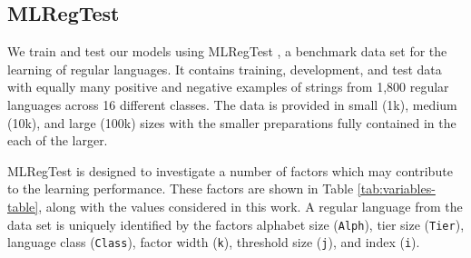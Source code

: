 \documentclass[twoside,11pt]{article}
\newcommand{\ttt}[1]{\texttt{#1}}
\newcommand{\tttx}[1]{\ttt{#1}\xspace}
\newcommand{\Alpha}{\tttx{Alph}}
\newcommand{\Tier}{\tttx{Tier}}
\newcommand{\Class}{\tttx{Class}}
\newcommand{\kay}{\tttx{k}}
\newcommand{\jay}{\tttx{j}}
\newcommand{\eye}{\tttx{i}}
\begin{document}

\subsection{MLRegTest} \label{sec:mlregtest}
We train and test our models using MLRegTest \citep{heinz-etal-2022-mlregtest}, a benchmark data set for the learning of regular languages. It contains training, development, and test data with equally many positive and negative examples of strings from 1,800 regular languages across 16 different classes. The data is provided in small (1k), medium (10k), and large (100k) sizes with the smaller preparations fully contained in the each of the larger.

MLRegTest is designed to investigate a number of factors which may contribute to the learning performance. These factors are shown in Table \ref{tab:variables-table}, along with the values considered in this work. A regular language from the data set is uniquely identified by the factors alphabet size (\Alpha), tier size (\Tier), language class (\Class), factor width (\kay), threshold size (\jay), and index (\eye).
\end{document}
